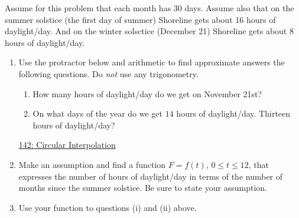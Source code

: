 \documentclass{ximera}
\begin{document}
\begin{exercise} \label{EPODRerDFGe}
Assume for this problem that each month has 30 days. Assume also that on the summer solstice (the first day of summer) Shoreline gets about 16 hours of daylight/day. And on the winter solsctice (December 21) Shoreline gets about $8$ hours of daylight/day.


\begin{enumerate}
\item Use the protractor below and arithmetic to find approximate answers the following questions. Do \emph{not} use any trigonometry.

\begin{enumerate}
\item How many hours of daylight/day do we get on November 21st?

\item On what days of the year do we get $14$ hours of daylight/day. Thirteen hours of daylight/day?
\end{enumerate}

\begin{onlineOnly}
    \begin{center}
\end{center}
\end{onlineOnly}

\href{https://www.desmos.com/calculator/nfsifbppzz}{142: Circular Interpolation}



\item Make an assumption and find a function $F=f(t)$, $0\leq t \leq 12$, that expresses the number of hours of daylight/day in terms of the number of months since the summer solstice. Be sure to state your assumption.

\item Use your function to questions  (i) and (ii) above.

\end{enumerate}
\end{exercise}
\end{document}
